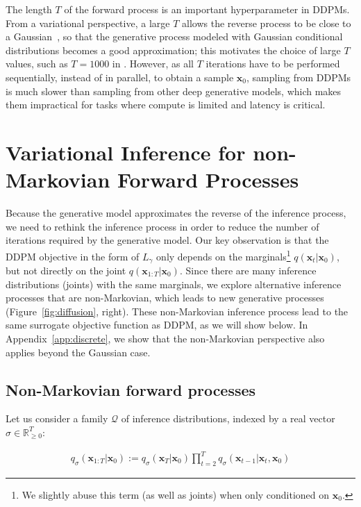 The length $T$ of the forward process is an important hyperparameter in DDPMs. From a variational perspective, a large $T$ allows the reverse process to be close to a Gaussian~\citep{sohl-dickstein2015deep}, so that the generative process modeled with Gaussian conditional distributions becomes a good approximation; this motivates the choice of large $T$ values, such as $T = 1000$ in \citet{ho2020denoising}. 
However, as all $T$ iterations have to be performed sequentially, instead of in parallel, to obtain a sample ${\bm{x}}_0$, sampling from DDPMs is much slower than sampling from other deep generative models, which makes them impractical for tasks where compute is limited and latency is critical. 

\section{Variational Inference for non-Markovian Forward Processes}
\label{sec:variational}

Because the generative model approximates the reverse of the inference process, we need to rethink the inference process in order to reduce the number of iterations required by the generative model. Our key observation is that the DDPM objective in the form of $L_\gamma$ only depends on the marginals\footnote{We slightly abuse this term (as well as joints) when only conditioned on ${\bm{x}}_0$.} $q({\bm{x}}_t | {\bm{x}}_0)$, but not directly on the joint $q({\bm{x}}_{1:T} | {\bm{x}}_{0})$. Since there are many inference distributions (joints) with the same marginals, we explore alternative inference processes that are non-Markovian, which leads to new generative processes (Figure~\ref{fig:diffusion}, right). These non-Markovian inference process lead to the same surrogate objective function as DDPM, as we will show below. In Appendix~\ref{app:discrete}, we show that the non-Markovian perspective also applies beyond the Gaussian case.

\subsection{Non-Markovian forward processes} Let us consider a family ${\mathcal{Q}}$ of inference distributions, indexed by a real vector $\sigma \in \mathbb{R}_{\geq 0}^{T}$:

\begin{gather}
    q_\sigma({\bm{x}}_{1:T} | {\bm{x}}_0) := q_\sigma({\bm{x}}_T | {\bm{x}}_0) \prod_{t=2}^{T} q_\sigma({\bm{x}}_{t-1} | {\bm{x}}_{t}, {\bm{x}}_0) \label{eq:diff-new}
\end{gather}

